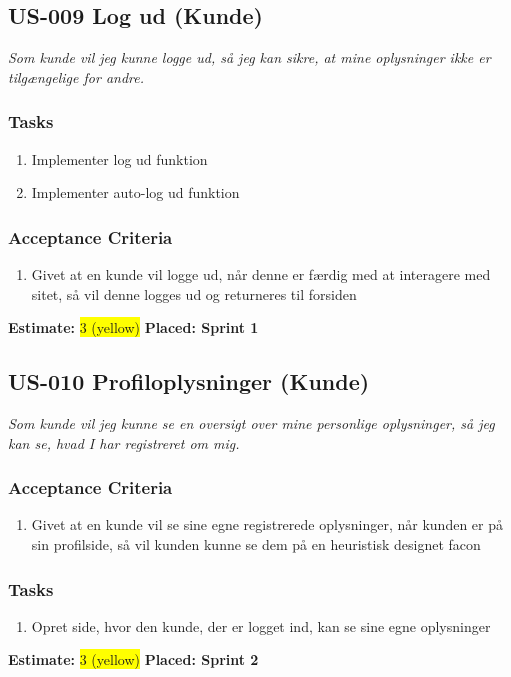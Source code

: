 \subsection{US-009 Log ud (Kunde)}
\label{sec:US-009}
\textit{Som kunde vil jeg kunne logge ud, så jeg kan sikre, at mine oplysninger ikke er tilgængelige for andre.}
\subsubsection*{\textbf{Tasks}}
\begin{enumerate}
  \item Implementer log ud funktion
  \item Implementer auto-log ud funktion
\end{enumerate}
\subsubsection*{\textbf{Acceptance Criteria}}
\begin{enumerate}
  \item Givet at en kunde vil logge ud, når denne er færdig med at interagere med sitet, så vil denne logges ud og returneres til forsiden
\end{enumerate}
\textbf{Estimate:} \colorbox{yellow}{3 (yellow)}
\textbf{Placed: Sprint 1}
\par\noindent\dotfill

\subsection{US-010 Profiloplysninger (Kunde)}
\label{sec:US-010}
\textit{Som kunde vil jeg kunne se en oversigt over mine personlige oplysninger, så jeg kan se, hvad I har registreret om mig.}
\subsubsection*{\textbf{Acceptance Criteria}}
\begin{enumerate}
  \item Givet at en kunde vil se sine egne registrerede oplysninger, når kunden er på sin profilside, så vil kunden kunne se dem på en heuristisk designet facon
\end{enumerate}
\subsubsection*{\textbf{Tasks}}
\begin{enumerate}
  \item Opret side, hvor den kunde, der er logget ind, kan se sine egne oplysninger
\end{enumerate}
\textbf{Estimate:} \colorbox{yellow}{3 (yellow)}
\textbf{Placed: Sprint 2}
\par\noindent\dotfill

